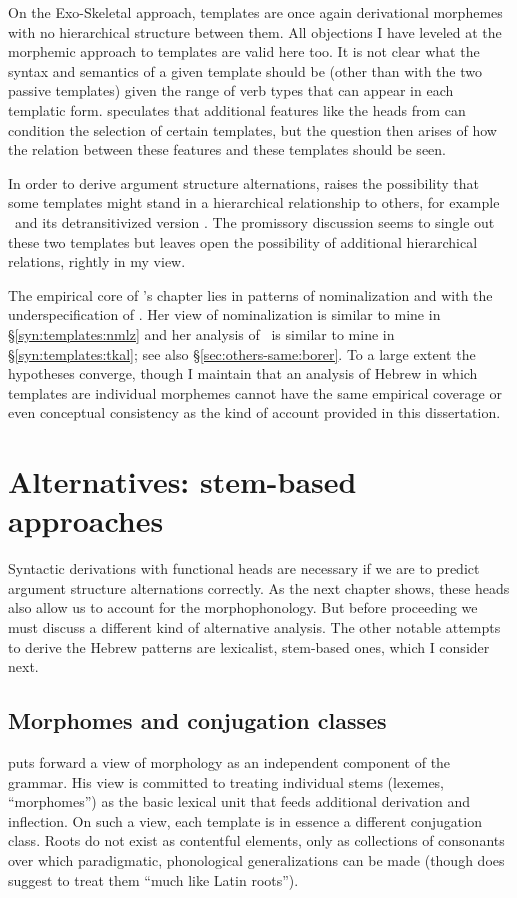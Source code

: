 On the Exo-Skeletal approach, templates are once again derivational morphemes with no hierarchical structure between them. All objections I have leveled at the morphemic approach to templates are valid here too. It is not clear what the syntax and semantics of a given template should be (other than with the two passive templates) given the range of verb types that can appear in each templatic form. \cite{borer15roots} speculates that additional features like the heads from \cite{doron03} can condition the selection of certain templates, but the question then arises of how the relation between these features and these templates should be seen.

In order to derive argument structure alternations, \citet[564]{borer13oup} raises the possibility that some templates might stand in a hierarchical relationship to others, for example \tpie~and its detransitivized version \thit. The promissory discussion seems to single out these two templates but leaves open the possibility of additional hierarchical relations, rightly in my view. 

The empirical core of \citeauthor{borer13oup}'s chapter lies in patterns of nominalization and with the underspecification of \tkal. Her view of nominalization is similar to mine in \S\ref{syn:templates:nmlz} and her analysis of \tkal~is similar to mine in \S\ref{syn:templates:tkal}; see also \S\ref{sec:others-same:borer}. To a large extent the hypotheses converge, though I maintain that an analysis of Hebrew in which templates are individual morphemes cannot have the same empirical coverage or even conceptual consistency as the kind of account provided in this dissertation.


\section{Alternatives: stem-based approaches}\label{syn:other-stem}
Syntactic derivations with functional heads are necessary if we are to predict argument structure alternations correctly. As the next chapter shows, these heads also allow us to account for the morphophonology. But before proceeding we must discuss a different kind of alternative analysis. The other notable attempts to derive the Hebrew patterns are lexicalist, stem-based ones, which I consider next.

	\subsection{Morphomes and conjugation classes \citep{aronoff94,aronoff07}}
\cite{aronoff94,aronoff07} puts forward a view of morphology as an independent component of the grammar. His view is committed to treating individual stems (lexemes, ``morphomes'') as the basic lexical unit that feeds additional derivation and inflection. On such a view, each template is in essence a different conjugation class. Roots do not exist as contentful elements, only as collections of consonants over which paradigmatic, phonological generalizations can be made (though \citealt[827]{aronoff07} does suggest to treat them ``much like Latin roots'').

